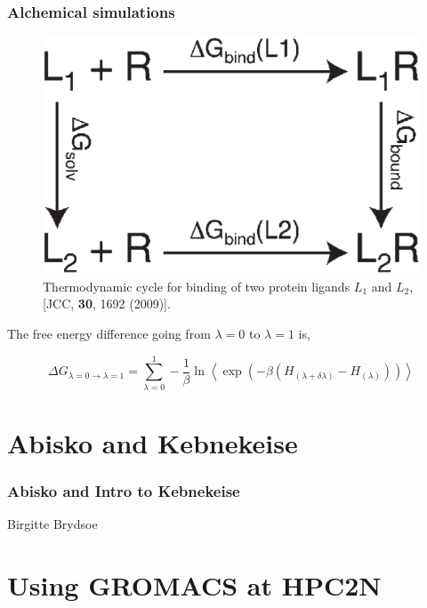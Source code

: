 \documentclass{beamer}
\begin{document}
\begin{frame}
\frametitle{Alchemical simulations}


\begin{figure}
\includegraphics[scale=0.08]{alchemical.eps}
\caption{{\scriptsize  Thermodynamic cycle for binding of two protein ligands $L_1$ and $L_2$,
[JCC, {\bf 30}, 1692 (2009)]. }}
\end{figure}

The free energy difference going from $\lambda=0$ to $\lambda=1$ is,


\begin{equation}                                                                                                                                            
	\Delta G _{\lambda=0 \rightarrow \lambda=1 } = \sum_{\lambda=0}^{1} -\frac{1}{\beta}
	\ln \left< \exp \left( -\beta (H_{(\lambda+\delta \lambda)} - H_{(\lambda)}   )   \right) \right>
\end{equation}

\end{frame}

\section{Abisko and Kebnekeise}
\begin{frame}\frametitle{Abisko and Intro to Kebnekeise}

	Birgitte Brydsoe
 
\end{frame}

\section{Using GROMACS at HPC2N}
\end{document}

